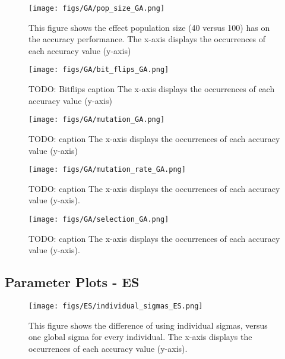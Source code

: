\documentclass{article}
\begin{document}
\begin{figure*}[htbp]
    \centering
    \texttt{[image: figs/GA/pop\_size\_GA.png]}
    \caption{
    This figure shows the effect population size (40 versus 100) has on the accuracy performance. 
    The x-axis displays the occurrences of each accuracy value (y-axis) 
    }
    \label{fig:A_GA_popsize}
\end{figure*}


\begin{figure*}[htbp]
    \centering
    \texttt{[image: figs/GA/bit\_flips\_GA.png]}
    \caption{
    TODO: Bitflips caption
    The x-axis displays the occurrences of each accuracy value (y-axis)
    }
    \label{fig:A_GA_bitflip}
\end{figure*}


\begin{figure*}[htbp]
    \centering
    \texttt{[image: figs/GA/mutation\_GA.png]}
    \caption{
    TODO: caption 
    The x-axis displays the occurrences of each accuracy value (y-axis)
    }
    \label{fig:A_GA_mutation}
\end{figure*}


\begin{figure}[htbp]
    \hspace*{-1.5 cm} 
    \centering
    \texttt{[image: figs/GA/mutation\_rate\_GA.png]}
    \caption{
    TODO: caption
    The x-axis displays the occurrences of each accuracy value (y-axis). }
    \label{fig:GA_mutation_rate}
\end{figure}


\begin{figure}[H]
    \centering
    \texttt{[image: figs/GA/selection\_GA.png]}
    \caption{
    TODO: caption
    The x-axis displays the occurrences of each accuracy value (y-axis). }
    \label{fig:GA_selection}
\end{figure}


\newpage


\subsection{Parameter Plots - ES}
\label{app:params_es}

\begin{figure*}[htbp]
    \centering
    \texttt{[image: figs/ES/individual\_sigmas\_ES.png]}
    \caption{
    This figure shows the difference of using individual sigmas, versus one global sigma for every individual. 
    The x-axis displays the occurrences of each accuracy value (y-axis).
    }
    \label{fig:A_ES_indivsigma}
\end{figure*}
\end{document}
